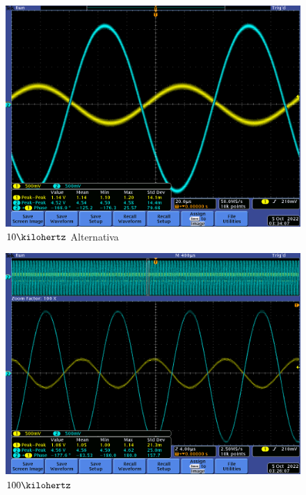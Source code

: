 \documentclass[12pt,letterpaper]{article}     %
\begin{document}
{\begin{figure}[!ht]
\centering
\includegraphics[scale=0.5]{imagenes/20.png}
\caption{$10\kilohertz$ Alternativa}
\label{fig:20}
\end{figure}

\begin{figure}[!ht]
\centering
\includegraphics[scale=0.5]{imagenes/16.png}
\caption{$100\kilohertz$}
\label{fig:16}
\end{figure}

}
\end{document}
